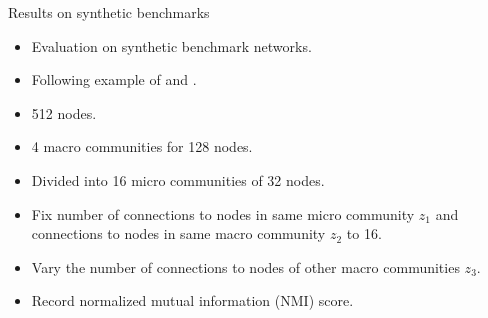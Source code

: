 \documentclass{beamer}
\begin{document}
	
	\begin{frame}{Results on synthetic benchmarks}
	\begin{itemize}
	\item Evaluation on synthetic benchmark networks.
	\item Following example of \cite{lancichinetti2009community} and \cite{yang2013hierarchical}.
	\item 512 nodes.
	\item 4 macro communities for 128 nodes.
	\item Divided into 16 micro communities of 32 nodes.
	\item Fix number of connections to nodes in same micro community $z_1$ and connections to nodes in same macro community $z_2$ to 16.
	\item Vary the number of connections to nodes of other macro communities $z_3$.
	\item Record normalized mutual information (NMI) score.
	\end{itemize}
	\end{frame}
	
\end{document}
